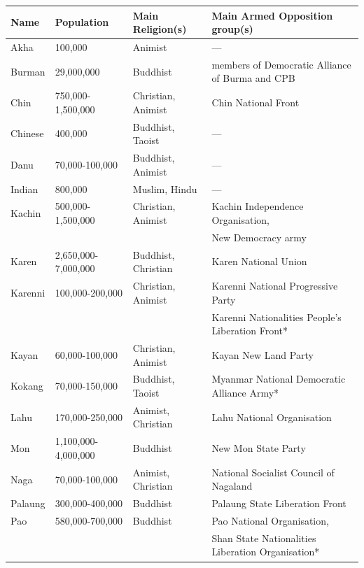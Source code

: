 \documentclass{article}
\begin{document}
\begin{table}[H]
\centering

\begin{tabular}{@{}lllp{5.5cm}@{}}

\toprule
Name    & Population          & Main Religion(s)   & Main Armed Opposition group(s) \\
\midrule
Akha    & 100,000             & Animist            & --- \\
Burman  & 29,000,000          & Buddhist           & members of Democratic Alliance of Burma and CPB \\
Chin    & 750,000-1,500,000   & Christian, Animist & Chin National Front \\
Chinese & 400,000             & Buddhist, Taoist   & --- \\
Danu    & 70,000-100,000      & Buddhist, Animist  & --- \\
Indian  & 800,000             & Muslim, Hindu      & --- \\
Kachin  & 500,000-1,500,000   & Christian, Animist & Kachin Independence Organisation, \\
        &                     &                    & New Democracy army \\
Karen   & 2,650,000-7,000,000 & Buddhist, Christian & Karen National Union \\
Karenni & 100,000-200,000     & Christian, Animist & Karenni National Progressive Party \\
        &                     &                    & Karenni Nationalities People's Liberation Front* \\
Kayan   & 60,000-100,000      & Christian, Animist & Kayan New Land Party \\
Kokang  & 70,000-150,000      & Buddhist, Taoist   & Myanmar National Democratic Alliance Army* \\
Lahu    & 170,000-250,000     & Animist, Christian & Lahu National Organisation \\
Mon     & 1,100,000-4,000,000 & Buddhist           & New Mon State Party \\
Naga    & 70,000-100,000      & Animist, Christian & National Socialist Council of Nagaland \\
Palaung & 300,000-400,000     & Buddhist           & Palaung State Liberation Front \\
Pao     & 580,000-700,000     & Buddhist           & Pao National Organisation, \\
        &                     &                    & Shan State Nationalities Liberation Organisation* \\

\end{tabular}
\end{table}
\end{document}
